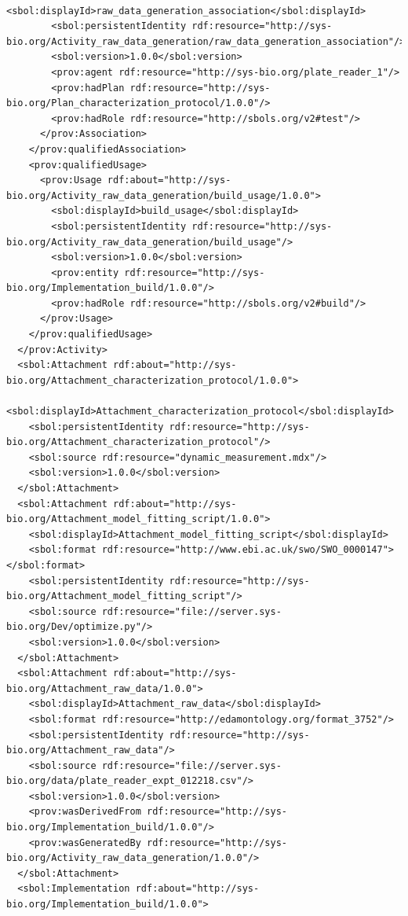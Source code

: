 \begin{lstlisting}
        <sbol:displayId>raw_data_generation_association</sbol:displayId>
        <sbol:persistentIdentity rdf:resource="http://sys-bio.org/Activity_raw_data_generation/raw_data_generation_association"/>
        <sbol:version>1.0.0</sbol:version>
        <prov:agent rdf:resource="http://sys-bio.org/plate_reader_1"/>
        <prov:hadPlan rdf:resource="http://sys-bio.org/Plan_characterization_protocol/1.0.0"/>
        <prov:hadRole rdf:resource="http://sbols.org/v2#test"/>
      </prov:Association>
    </prov:qualifiedAssociation>
    <prov:qualifiedUsage>
      <prov:Usage rdf:about="http://sys-bio.org/Activity_raw_data_generation/build_usage/1.0.0">
        <sbol:displayId>build_usage</sbol:displayId>
        <sbol:persistentIdentity rdf:resource="http://sys-bio.org/Activity_raw_data_generation/build_usage"/>
        <sbol:version>1.0.0</sbol:version>
        <prov:entity rdf:resource="http://sys-bio.org/Implementation_build/1.0.0"/>
        <prov:hadRole rdf:resource="http://sbols.org/v2#build"/>
      </prov:Usage>
    </prov:qualifiedUsage>
  </prov:Activity>
  <sbol:Attachment rdf:about="http://sys-bio.org/Attachment_characterization_protocol/1.0.0">
    <sbol:displayId>Attachment_characterization_protocol</sbol:displayId>
    <sbol:persistentIdentity rdf:resource="http://sys-bio.org/Attachment_characterization_protocol"/>
    <sbol:source rdf:resource="dynamic_measurement.mdx"/>
    <sbol:version>1.0.0</sbol:version>
  </sbol:Attachment>
  <sbol:Attachment rdf:about="http://sys-bio.org/Attachment_model_fitting_script/1.0.0">
    <sbol:displayId>Attachment_model_fitting_script</sbol:displayId>
    <sbol:format rdf:resource="http://www.ebi.ac.uk/swo/SWO_0000147"></sbol:format>
    <sbol:persistentIdentity rdf:resource="http://sys-bio.org/Attachment_model_fitting_script"/>
    <sbol:source rdf:resource="file://server.sys-bio.org/Dev/optimize.py"/>
    <sbol:version>1.0.0</sbol:version>
  </sbol:Attachment>
  <sbol:Attachment rdf:about="http://sys-bio.org/Attachment_raw_data/1.0.0">
    <sbol:displayId>Attachment_raw_data</sbol:displayId>
    <sbol:format rdf:resource="http://edamontology.org/format_3752"/>
    <sbol:persistentIdentity rdf:resource="http://sys-bio.org/Attachment_raw_data"/>
    <sbol:source rdf:resource="file://server.sys-bio.org/data/plate_reader_expt_012218.csv"/>
    <sbol:version>1.0.0</sbol:version>
    <prov:wasDerivedFrom rdf:resource="http://sys-bio.org/Implementation_build/1.0.0"/>
    <prov:wasGeneratedBy rdf:resource="http://sys-bio.org/Activity_raw_data_generation/1.0.0"/>
  </sbol:Attachment>
  <sbol:Implementation rdf:about="http://sys-bio.org/Implementation_build/1.0.0">

\end{lstlisting}
